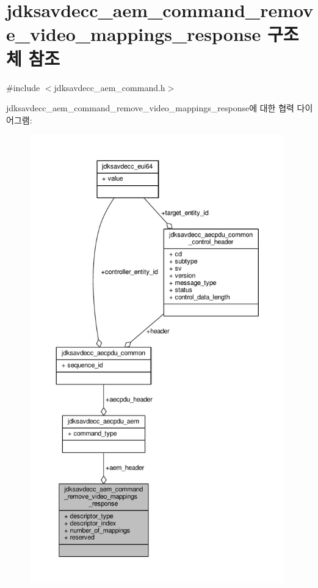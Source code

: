 \hypertarget{structjdksavdecc__aem__command__remove__video__mappings__response}{}\section{jdksavdecc\+\_\+aem\+\_\+command\+\_\+remove\+\_\+video\+\_\+mappings\+\_\+response 구조체 참조}
\label{structjdksavdecc__aem__command__remove__video__mappings__response}


{\ttfamily \#include $<$jdksavdecc\+\_\+aem\+\_\+command.\+h$>$}



jdksavdecc\+\_\+aem\+\_\+command\+\_\+remove\+\_\+video\+\_\+mappings\+\_\+response에 대한 협력 다이어그램\+:
\nopagebreak
\begin{figure}[H]
\begin{center}
\leavevmode
\includegraphics[height=550pt]{structjdksavdecc__aem__command__remove__video__mappings__response__coll__graph}
\end{center}
\end{figure}
